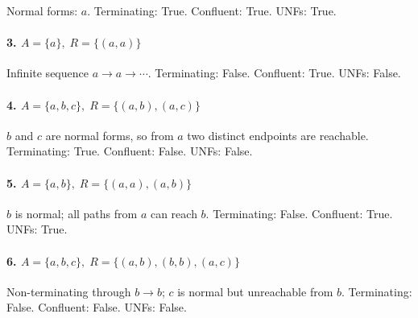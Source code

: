 \documentclass[11pt]{article}
\newcommand{\ARSnode}[1]{%
  \node[circle,draw,minimum size=7mm,inner sep=0pt] (#1) {$#1$};%
}
\newcommand{\ARSnodeat}[2]{%
  \node[circle,draw,minimum size=7mm,inner sep=0pt, #2] (#1) {$#1$};%
}
\begin{document}
Normal forms: $a$. Terminating: True. Confluent: True. UNFs: True.

\paragraph{3.\; $A=\{a\},\; R=\{(a,a)\}$}

Infinite sequence $a\to a\to\cdots$.  
Terminating: False. Confluent: True. UNFs: False.

\paragraph{4.\; $A=\{a,b,c\},\; R=\{(a,b),(a,c)\}$}

$b$ and $c$ are normal forms, so from $a$ two distinct endpoints are reachable.  
Terminating: True. Confluent: False. UNFs: False.

\paragraph{5.\; $A=\{a,b\},\; R=\{(a,a),(a,b)\}$}

$b$ is normal; all paths from $a$ can reach $b$.  
Terminating: False. Confluent: True. UNFs: True.

\paragraph{6.\; $A=\{a,b,c\},\; R=\{(a,b),(b,b),(a,c)\}$}

Non-terminating through $b\to b$; $c$ is normal but unreachable from $b$.  
Terminating: False. Confluent: False. UNFs: False.
\end{document}
